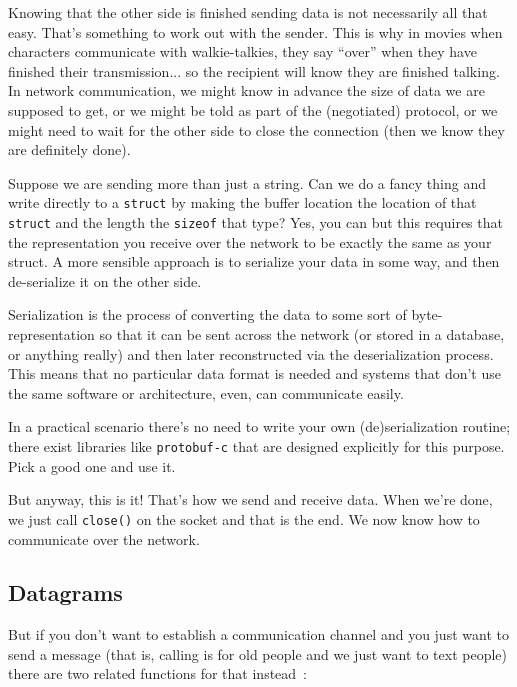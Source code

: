 \documentclass[a4paper]{report}
\begin{document}
Knowing that the other side is finished sending data is not necessarily all that easy. That's something to work out with the sender. This is why in movies when characters communicate with walkie-talkies, they say ``over'' when they have finished their transmission... so the recipient will know they are finished talking. In network communication, we might know in advance the size of data we are supposed to get, or we might be told as part of the (negotiated) protocol, or we might need to wait for the other side to close the connection (then we know they are definitely done).

Suppose we are sending more than just a string. Can we do a fancy thing and write directly to a \texttt{struct} by making the buffer location the location of that \texttt{struct} and the length the \texttt{sizeof} that type? Yes, you can but this requires that the representation you receive over the network to be exactly the same as your struct. A more sensible approach is to serialize your data in some way, and then de-serialize it on the other side.

Serialization is the process of converting the data to some sort of byte-representation so that it can be sent across the network (or stored in a database, or anything really) and then later reconstructed via the deserialization process. This means that no particular data format is needed and systems that don't use the same software or architecture, even, can communicate easily.

In a practical scenario there's no need to write your own (de)serialization routine; there exist libraries like \texttt{protobuf-c} that are designed explicitly for this purpose. Pick a good one and use it.

But anyway, this is it! That's how we send and receive data. When we're done, we just call \texttt{close()} on the socket and that is the end. We now know how to communicate over the network.


\subsection*{Datagrams}
But if you don't want to establish a communication channel and you just want to send a message (that is, calling is for old people and we just want to text people) there are two related functions for that instead~\cite{getaddrinfo}:
\end{document}
